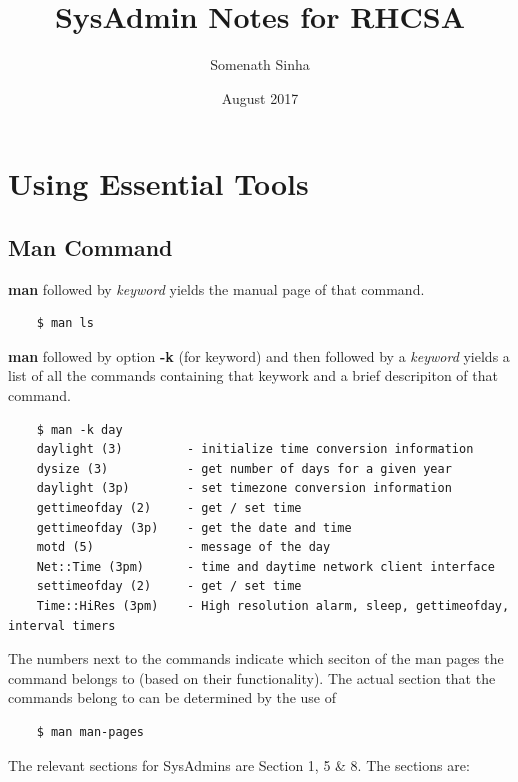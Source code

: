 \documentclass{report}
\title{SysAdmin Notes for RHCSA}
\author{Somenath Sinha}
\date{August 2017}
\begin{document}
	\maketitle
	\newpage
	
	\chapter{Using Essential Tools}
	\section{Man Command}
	
	\textbf{man} followed by \textit{keyword} yields the manual page of that command. 
	\vspace{-20pt}
	\begin{verbatim}
	$ man ls
	\end{verbatim}
	
	\vspace{-15pt}
	\noindent
	\textbf{man} followed by option \textbf{-k} (for keyword) and then followed by a \textit{keyword} yields a list of all the commands containing that keywork and a brief descripiton of that command.
	\vspace{-20pt} 
	\begin{verbatim}
	$ man -k day
	daylight (3)         - initialize time conversion information
	dysize (3)           - get number of days for a given year
	daylight (3p)        - set timezone conversion information
	gettimeofday (2)     - get / set time
	gettimeofday (3p)    - get the date and time
	motd (5)             - message of the day
	Net::Time (3pm)      - time and daytime network client interface
	settimeofday (2)     - get / set time
	Time::HiRes (3pm)    - High resolution alarm, sleep, gettimeofday, interval timers
	\end{verbatim}
	
	\vspace{-15pt}
	\noindent
	The numbers next to the commands indicate which seciton of the man pages the command belongs to (based on their functionality). The actual section that the commands belong to can be determined by the use of 
	
	\vspace{-20pt}
	\begin{verbatim}
	$ man man-pages
	\end{verbatim}
	
	\vspace{-15pt}
	\noindent
	The relevant sections for SysAdmins are Section 1, 5 \& 8. The sections are:
	
\end{document}
